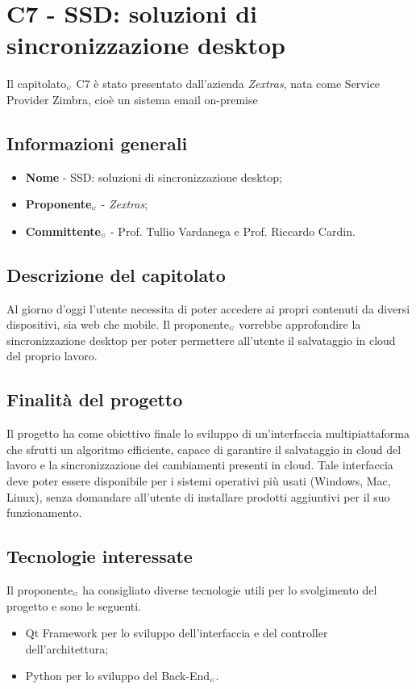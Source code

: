 \chapter{C7 - SSD: soluzioni di sincronizzazione desktop}
\label{CapitolatoC7}
Il capitolato$_{\scaleto{G}{3pt}}$ C7 è stato presentato dall'azienda \textit{Zextras}, nata come Service Provider Zimbra, cioè un sistema email on-premise
\section{Informazioni generali} \label{C7InformazioniGenerali}
\begin{itemize}
	\item \textbf{Nome} - SSD: soluzioni di sincronizzazione desktop;
	\item \textbf{Proponente}$_{\scaleto{G}{3pt}}$ - \textit{Zextras};
	\item \textbf{Committente}$_{\scaleto{G}{3pt}}$ - Prof. Tullio Vardanega e Prof. Riccardo Cardin.
\end{itemize}
\section{Descrizione del capitolato} \label{C7DescrizioneDelCapitolato}
Al giorno d'oggi l'utente necessita di poter accedere ai propri contenuti da diversi dispositivi, sia web che mobile. Il proponente$_{\scaleto{G}{3pt}}$ vorrebbe approfondire la sincronizzazione desktop per poter permettere all'utente il salvataggio in cloud del proprio lavoro.
\section{Finalità del progetto} \label{C7FinalitàDelProgetto}
Il progetto ha come obiettivo finale lo sviluppo di un'interfaccia multipiattaforma che sfrutti un algoritmo efficiente, capace di garantire il salvataggio in cloud del lavoro e la sincronizzazione dei cambiamenti presenti in cloud. Tale interfaccia deve poter essere disponibile per i sistemi operativi più usati (Windows, Mac, Linux), senza domandare all'utente di installare prodotti aggiuntivi per il suo funzionamento. 
\section{Tecnologie interessate} \label{C7TecnologieInteressate}
Il proponente$_{\scaleto{G}{3pt}}$ ha consigliato diverse tecnologie utili per lo svolgimento del progetto e sono le seguenti.
\begin{itemize}
	\item Qt Framework per lo sviluppo dell'interfaccia e del controller dell'architettura;
	\item Python per lo sviluppo del Back-End$_{\scaleto{G}{3pt}}$.
\end{itemize}

